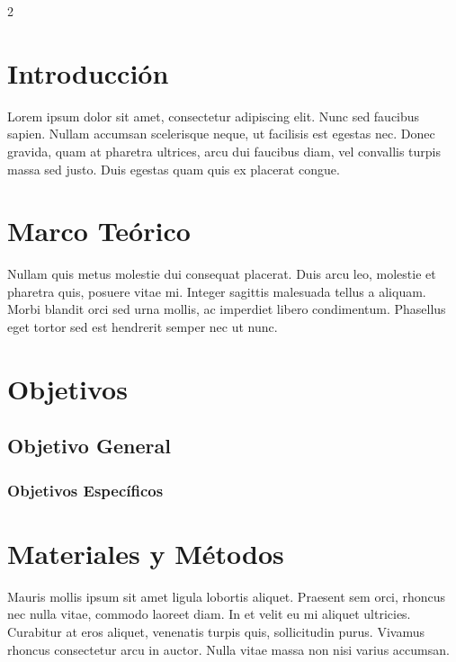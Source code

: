 \documentclass{article}
\begin{document}
     
\begin{multicols}{2}

 \vspace{-1.2cm}
 \section*{\center Introducción}
  Lorem ipsum dolor sit amet, consectetur adipiscing elit. Nunc sed faucibus sapien. Nullam accumsan scelerisque neque, ut facilisis est egestas nec. Donec gravida, quam at pharetra ultrices, arcu dui faucibus diam, vel convallis turpis massa sed justo. Duis egestas quam quis ex placerat congue. 
  \vspace{-1.2cm}
 \section*{\center Marco Teórico}
    Nullam quis metus molestie dui consequat placerat. Duis arcu leo, molestie et pharetra quis, posuere vitae mi. Integer sagittis malesuada tellus a aliquam. Morbi blandit orci sed urna mollis, ac imperdiet libero condimentum. Phasellus eget tortor sed est hendrerit semper nec ut nunc.
     \vspace{-1.2cm}
 \section*{\center Objetivos}
  \subsection*{Objetivo General} 
  \subsubsection*{Objetivos Específicos}
   \vspace{-1.0cm}
 \section*{\center Materiales y Métodos}
 Mauris mollis ipsum sit amet ligula lobortis aliquet. Praesent sem orci, rhoncus nec nulla vitae, commodo laoreet diam. In et velit eu mi aliquet ultricies. Curabitur at eros aliquet, venenatis turpis quis, sollicitudin purus. Vivamus rhoncus consectetur arcu in auctor. Nulla vitae massa non nisi varius accumsan.
  \vspace{-1.2cm}

\end{multicols}
\end{document}
